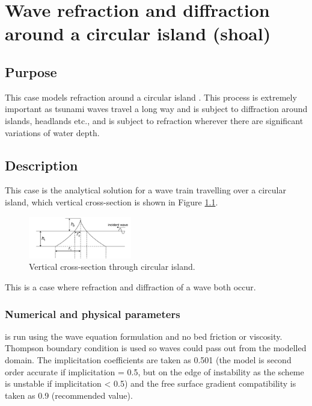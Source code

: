 \chapter{Wave refraction and diffraction around a circular island (shoal)}

\section{Purpose}

This case models refraction around a circular island \cite{Jung2010}.
This process is extremely important as tsunami waves travel a long way and
is subject to diffraction around islands, headlands etc., and is subject to
refraction wherever there are significant variations of water depth.

\section{Description}

This case is the analytical solution for a wave train travelling over a circular
island, which vertical cross-section is shown in Figure
\ref{t2d:shoal:fig:VertSection}.

\begin{figure}[!htbp]
 \centering
 \includegraphics[width=0.4\textwidth]{img/VertSection.png}
 \caption{Vertical cross-section through circular island.}
 \label{t2d:shoal:fig:VertSection}
\end{figure}

This is a case where refraction and diffraction of a wave both occur.

\subsection{Numerical and physical parameters}
 is run using the wave equation formulation and no
bed friction or viscosity.
Thompson boundary condition is used so waves could pass out from the modelled domain.
The implicitation coefficients are taken as 0.501 (the model is second order
accurate if implicitation = 0.5, but on the edge of instability as the scheme is
unstable if implicitation < 0.5) and the free surface gradient compatibility is
taken as 0.9 (recommended value).

